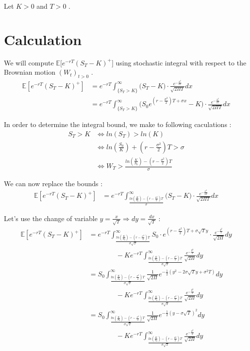 \documentclass[hidelinks]{article}
\newcommand{\esp}{\mathbb{E}\left[e^{-rT}(S_{T}-K)^{+}\right]}
\newcommand{\dd}{\frac{ln\left(\frac{K}{S_{0}}\right)-\left(r-\frac{\sigma^{2}}{2}\right) T}{\sigma}}
\newcommand{\ddd}{\frac{ln\left(\frac{K}{S_{0}}\right)-\left(r-\frac{\sigma^{2}}{2}\right) T}{\sigma \sqrt{T}}}
\newenvironment{nalign}{
    \begin{equation}
    \begin{aligned}
}{
    \end{aligned}
    \end{equation}
    \ignorespacesafterend
}
\begin{document}
	Let $K>0$ and $T>0$ .
    
    \section{Calculation}
    We will compute $\mathbb{E}\big[e^{-rT}(S_{T}-K)^{+}\big]$ using stochastic integral with respect to the Brownian motion $(W_{t})_{t>0}$ .
    \begin{nalign}
    \esp & = e^{-rT}\int_{\{S_{T}>K\}}^{\infty} \big( S_{T}-K\big) \cdot \frac{e^{-\frac{x^{2}}{2T}}}{\sqrt{2\Pi T}} dx
    \\ & = e^{-rT}\int_{\{S_{T}>K\}}^{\infty} \big( S_{0}e^{(r-\frac{\sigma^{2}}{2})T+\sigma x}-K\big) \cdot \frac{e^{-\frac{x^{2}}{2T}}}{\sqrt{2\Pi T}} dx
    \end{nalign}
    
    In order to determine the integral bound, we make to following caculations :
    \begin{nalign}
    S_{T}>K & \Leftrightarrow ln\left( S_{T} \right)>ln\left( K \right)
    \\  & \Leftrightarrow ln\left( \frac{S_{0}}{K} \right)+\left( r-\frac{\sigma^{2}}{2} \right)T > \sigma 
    \\  & \Leftrightarrow W_{T} > \dd
    \end{nalign}

	We can now replace the bounds :
	\begin{nalign}
    \esp & = e^{-rT}\int_{\dd}^{\infty} \big( S_{T}-K\big) \cdot \frac{e^{-\frac{x^{2}}{2T}}}{\sqrt{2\Pi T}} dx
    \end{nalign}


	Let's use the change of variable $y=\frac{x}{\sqrt{T}} \Rightarrow dy = \frac{dx}{\sqrt{T}}$ :
	\begin{equation}
    \begin{split}
    \esp &= e^{-rT}\int_{\ddd}^{\infty} S_{0} \cdot e^{(r-\frac{\sigma^{2}}{2})T+\sigma \sqrt{T}y} \cdot \frac{e^{-\frac{y^{2}}{2}}}{\sqrt{2\Pi}} dy \\
     &\qquad\qquad - K  e^{-rT}\int_{\ddd}^{\infty} \frac{e^{-\frac{y^{2}}{2}}}{\sqrt{2\Pi}} dy \\
    & = S_{0} \int_{\ddd}^{\infty} \frac{1}{\sqrt{2\Pi}} e^{-\frac{1}{2}\left( y^{2} - 2\sigma\sqrt{T}y + \sigma^{2}T\right)} dy \\ 
   &\qquad\qquad - K  e^{-rT}\int_{\ddd}^{\infty} \frac{e^{-\frac{y^{2}}{2}}}{\sqrt{2\Pi}} dy  \\
     & = S_{0} \int_{\ddd}^{\infty} \frac{1}{\sqrt{2\Pi}} e^{-\frac{1}{2}\left( y - \sigma\sqrt{T}\right)^{2}} dy \\
    & \qquad\qquad- K  e^{-rT}\int_{\ddd}^{\infty} \frac{e^{-\frac{y^{2}}{2}}}{\sqrt{2\Pi}} dy  
    \end{split}
    \end{equation}
\end{document}
